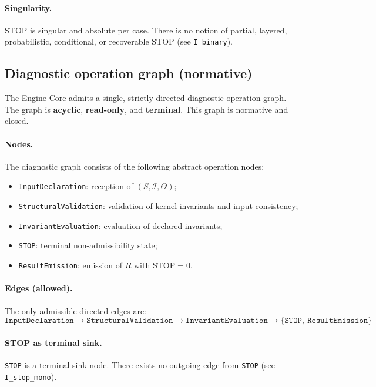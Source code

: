 \paragraph{Singularity.}
STOP is singular and absolute per case.
There is no notion of partial, layered, probabilistic,
conditional, or recoverable STOP
(see \texttt{I\_binary}).

\subsection{Diagnostic operation graph (normative)}

The Engine Core admits a single, strictly directed diagnostic operation graph.
The graph is \textbf{acyclic}, \textbf{read-only}, and \textbf{terminal}.
This graph is normative and closed.

\paragraph{Nodes.}
The diagnostic graph consists of the following abstract operation nodes:
\begin{itemize}
  \item \texttt{InputDeclaration}: reception of $(S,\mathcal{I},\Theta)$;
  \item \texttt{StructuralValidation}:
        validation of kernel invariants and input consistency;
  \item \texttt{InvariantEvaluation}:
        evaluation of declared invariants;
  \item \texttt{STOP}:
        terminal non-admissibility state;
  \item \texttt{ResultEmission}:
        emission of $R$ with $\mathrm{STOP}=0$.
\end{itemize}

\paragraph{Edges (allowed).}
The only admissible directed edges are:
\[
\texttt{InputDeclaration}
\rightarrow
\texttt{StructuralValidation}
\rightarrow
\texttt{InvariantEvaluation}
\rightarrow
\{\texttt{STOP},\ \texttt{ResultEmission}\}
\]

\paragraph{STOP as terminal sink.}
\texttt{STOP} is a terminal sink node.
There exists no outgoing edge from \texttt{STOP}
(see \texttt{I\_stop\_mono}).

